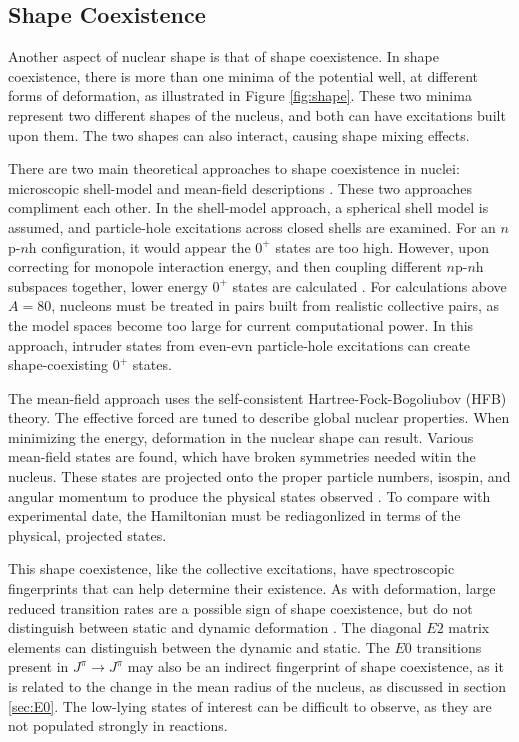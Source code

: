 \subsection{Shape Coexistence}

Another aspect of nuclear shape is that of shape coexistence. In shape coexistence, there is more than one minima of the potential well, at different forms of deformation, as illustrated in Figure \ref{fig:shape}. These two minima represent two different shapes of the nucleus, and both can have excitations built upon them. The two shapes can also interact, causing shape mixing effects. 



There are two main theoretical approaches to shape coexistence in nuclei: microscopic shell-model and mean-field descriptions \citep{heyde11:_shape_coexist}. These two approaches compliment each other. In the shell-model approach, a spherical shell model is assumed, and particle-hole excitations across closed shells are examined. For an $n$p-$n$h configuration, it would appear the $0^+$ states are too high. However, upon correcting for monopole interaction energy, and then coupling different $n$p-$n$h subspaces together, lower energy $0^+$ states are calculated \citep{caurier07:_shape_coexist}. For calculations above $A=80$, nucleons must be treated in pairs built from realistic collective pairs, as the model spaces become too large for current computational power\citep{heyde11:_shape_coexist}. In this approach, intruder states from even-evn particle-hole excitations can create shape-coexisting $0^+$ states.

The mean-field approach uses the self-consistent Hartree-Fock-Bogoliubov (HFB) theory. The effective forced are tuned to describe global nuclear properties. When minimizing the energy, deformation in the nuclear shape can result. Various mean-field states are found, which have broken symmetries needed witin the nucleus. These states are projected onto the proper particle numbers, isospin, and angular momentum to produce the physical states observed \citep{heyde11:_shape_coexist}. To compare with experimental date, the Hamiltonian must be rediagonlized in terms of the physical, projected states.

This shape coexistence, like the collective excitations, have spectroscopic fingerprints that can help determine their existence. As with deformation, large reduced transition rates are a possible sign of shape coexistence, but do not distinguish between static and dynamic deformation \citep{heyde11:_shape_coexist}. The diagonal $E2$ matrix elements can distinguish between the dynamic and static. The $E0$ transitions present in $J^{\pi}\rightarrow J^{\pi}$ may also be an indirect fingerprint of shape coexistence, as it is related to the change in the mean radius of the nucleus, as discussed in section \ref{sec:E0}\citep{wood99:_e0}. The low-lying states of interest can be difficult to observe, as they are not populated strongly in reactions.


